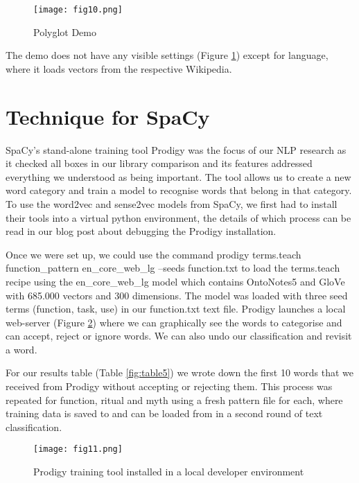\documentclass[12pt, usenames, dvipsnames]{report}
\begin{document}
\begin{flushleft}
\vspace*{1.2em}
\begin{figure}[!htbp]
  \hspace*{-3.666em}
  \texttt{[image: fig10.png]}
  \caption{Polyglot Demo}
  \label{fig:figure10}
\end{figure}
\vspace*{1.2em}

The demo does not have any visible settings (Figure \ref{fig:figure10}) except for language, where it loads vectors from the respective Wikipedia.


\section{Technique for SpaCy}

SpaCy’s stand-alone training tool Prodigy was the focus of our NLP research as it checked all boxes in our library comparison and its features addressed everything we understood as being important.
The tool allows us to create a new word category and train a model to recognise words that belong in that category.
To use the word2vec and sense2vec models from SpaCy, we first had to install their tools into a virtual python environment, the details of which process can be read in our blog post about debugging the Prodigy installation.

Once we were set up, we could use the command prodigy terms.teach function\_pattern en\_core\_web\_lg --seeds function.txt to load the terms.teach recipe using the en\_core\_web\_lg model which contains OntoNotes5 and GloVe with 685.000 vectors and 300 dimensions.
The model was loaded with three seed terms (function, task, use) in our function.txt text file.
Prodigy launches a local web-server (Figure \ref{fig:figure11}) where we can graphically see the words to categorise and can accept, reject or ignore words.
We can also undo our classification and revisit a word.

For our results table (Table \ref{fig:table5}) we wrote down the first 10 words that we received from Prodigy without accepting or rejecting them.
This process was repeated for function, ritual and myth using a fresh pattern file for each, where training data is saved to and can be loaded from in a second round of text classification.

\vspace*{1.2em}
\begin{figure}[!htbp]
  \hspace*{-3.666em}
  \texttt{[image: fig11.png]}
  \caption{Prodigy training tool installed in a local developer environment}
  \label{fig:figure11}
\end{figure}
\vspace*{1.2em}


\end{flushleft}
\end{document}
